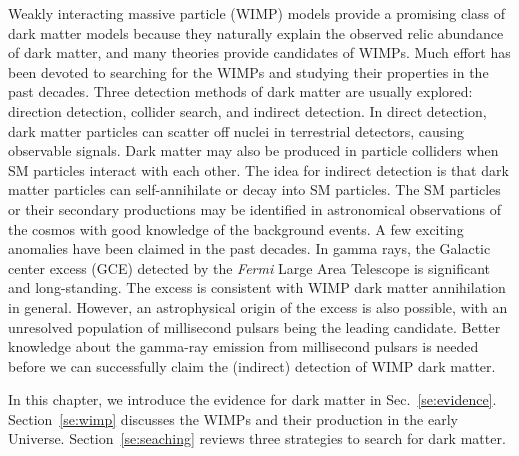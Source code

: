 \documentclass[doublespace,nopageskip]{VTthesis}
\begin{document}
Weakly interacting massive particle (WIMP) models provide a promising class of dark matter models because they naturally explain the observed relic abundance of dark matter, and many theories provide candidates of WIMPs. Much effort has been devoted to searching for the WIMPs and studying their properties in the past decades. Three detection methods of dark matter are usually explored: direction detection, collider search, and indirect detection. {In direct detection, dark matter particles can scatter off nuclei in terrestrial detectors, causing observable signals. Dark matter may also be produced in particle colliders when SM particles interact with each other.} The idea for indirect detection is that dark matter particles can self-annihilate or decay into SM particles. The SM particles or their secondary productions may be identified in astronomical observations of the cosmos with good knowledge of the background events. A few exciting anomalies have been claimed in the past decades. In gamma rays, the Galactic center excess (GCE) detected by the \textit{Fermi} Large Area Telescope is significant and long-standing. The excess is consistent with WIMP dark matter annihilation in general. However, an astrophysical origin of the excess is also possible, with an unresolved population of millisecond pulsars being the leading candidate. Better knowledge about the gamma-ray emission from millisecond pulsars is needed before we can successfully claim the (indirect) detection of WIMP dark matter.

{
In this chapter, we introduce the evidence for dark matter in Sec.~\ref{se:evidence}. Section~\ref{se:wimp} discusses the WIMPs and their production in the early Universe. Section~\ref{se:seaching} reviews three strategies to search for dark matter.
}

\end{document}
